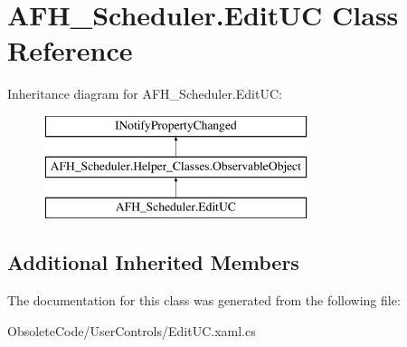 \section{A\+F\+H\+\_\+\+Scheduler.\+Edit\+UC Class Reference}
\label{class_a_f_h___scheduler_1_1_edit_u_c}
Inheritance diagram for A\+F\+H\+\_\+\+Scheduler.\+Edit\+UC\+:\begin{figure}[H]
\begin{center}
\leavevmode
\includegraphics[height=3.000000cm]{class_a_f_h___scheduler_1_1_edit_u_c}
\end{center}
\end{figure}
\subsection*{Additional Inherited Members}


The documentation for this class was generated from the following file\+:\begin{DoxyCompactItemize}
\item 
Obsolete\+Code/\+User\+Controls/Edit\+U\+C.\+xaml.\+cs\end{DoxyCompactItemize}
